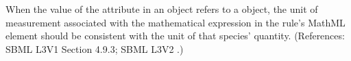 When the value of the attribute  in an \AssignmentRule
object refers to a \Species object, the unit of measurement associated with
the mathematical expression in the rule's MathML  element
should be consistent with the unit of that species' quantity.  (References:
SBML L3V1 Section 4.9.3; SBML L3V2 .)
